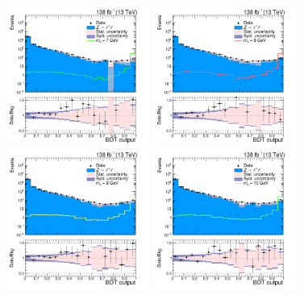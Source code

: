 \begin{figure}[htbp]
  \begin{center}
		\includegraphics[width=0.42\textwidth]{figures/chapter04/BDT_score/mvaVal_M7_log.png}
        \includegraphics[width=0.42\textwidth]{figures/chapter04/BDT_score/mvaVal_M8_log.png} \\
		\includegraphics[width=0.42\textwidth]{figures/chapter04/BDT_score/mvaVal_M9_log.png}
		\includegraphics[width=0.42\textwidth]{figures/chapter04/BDT_score/mvaVal_M10_log.png}\\

\end{center}
\end{figure}
